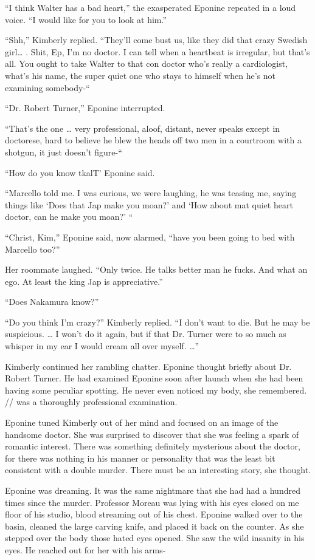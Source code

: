 \documentclass[]{article}
\begin{document}
{“I think Walter has a bad heart,” the exasperated Eponine repeated in a loud voice.  “I would like for you to look at him.”

“Shh,” Kimberly replied.  “They’ll come bust us, like they did that crazy Swedish girl… .  Shit, Ep, I’m no doctor.  I can tell when a heartbeat is irregular, but that’s all.  You ought to take Walter to that con doctor who’s really a cardiologist, what’s his name, the super quiet one who stays to himself when he’s not examining somebody-“

“Dr.  Robert Turner,” Eponine interrupted.

“That’s the one … very professional, aloof, distant, never speaks except in doctorese, hard to believe he blew the heads off two men in a courtroom with a shotgun, it just doesn’t figure-“

“How do you know tkalT’ Eponine said.

“Marcello told me.  I was curious, we were laughing, he was teasing me, saying things like ‘Does that Jap make you moan?’ and ‘How about mat quiet heart doctor, can he make you moan?’ “

“Christ, Kim,” Eponine said, now alarmed, “have you been going to bed with Marcello too?”

Her roommate laughed.  “Only twice.  He talks better man he fucks.  And what an ego.  At least the king Jap is appreciative.”

“Does Nakamura know?”

“Do you think I’m crazy?” Kimberly replied.  “I don’t want to die.  But he may be suspicious.  … I won’t do it again, but if that Dr.  Turner were to so much as whisper in my ear I would cream all over myself.  …”

Kimberly continued her rambling chatter.  Eponine thought briefly about Dr.  Robert Turner.  He had examined Eponine soon after launch when she had been having some peculiar spotting.  He never even noticed my body, she remembered.  // was a thoroughly professional examination.

Eponine tuned Kimberly out of her mind and focused on an image of the handsome doctor.  She was surprised to discover that she was feeling a spark of romantic interest.  There was something definitely mysterious about the doctor, for there was nothing in his manner or personality that was the least bit consistent with a double murder.  There must be an interesting story, she thought.

Eponine was dreaming.  It was the same nightmare that she had had a hundred times since the murder.  Professor Moreau was lying with his eyes closed on me floor of his studio, blood streaming out of his chest.  Eponine walked over to the basin, cleaned the large carving knife, and placed it back on the counter.  As she stepped over the body those hated eyes opened.  She saw the wild insanity in his eyes.  He reached out for her with his arms-

}
\end{document}
